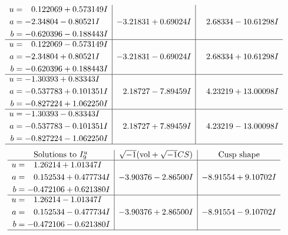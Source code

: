 \documentclass[1p]{elsarticle_modified}
\theoremstyle{definition}
\newcommand{\I}{\sqrt{-1}}
\begin{document}
$$\begin{array}{c|c|c}
\begin{aligned}
u &= \phantom{-}0.122069 + 0.573149 I \\
a &= -2.34804 - 0.80521 I \\
b &= -0.620396 - 0.188443 I\end{aligned}
 & -3.21831 + 0.69024 I & \phantom{-}2.68334 - 10.61298 I \\ \hline\begin{aligned}
u &= \phantom{-}0.122069 - 0.573149 I \\
a &= -2.34804 + 0.80521 I \\
b &= -0.620396 + 0.188443 I\end{aligned}
 & -3.21831 - 0.69024 I & \phantom{-}2.68334 + 10.61298 I \\ \hline\begin{aligned}
u &= -1.30393 + 0.83343 I \\
a &= -0.537783 + 0.101351 I \\
b &= -0.827224 + 1.062250 I\end{aligned}
 & \phantom{-}2.18727 - 7.89459 I & \phantom{-}4.23219 + 13.00098 I \\ \hline\begin{aligned}
u &= -1.30393 - 0.83343 I \\
a &= -0.537783 - 0.101351 I \\
b &= -0.827224 - 1.062250 I\end{aligned}
 & \phantom{-}2.18727 + 7.89459 I & \phantom{-}4.23219 - 13.00098 I\\
 \hline 
 \end{array}$$\newpage$$\begin{array}{c|c|c}  
\text{Solutions to }I^u_{9}& \I (\text{vol} + \sqrt{-1}CS) & \text{Cusp shape}\\
 \hline 
\begin{aligned}
u &= \phantom{-}1.26214 + 1.01347 I \\
a &= \phantom{-}0.152534 + 0.477734 I \\
b &= -0.472106 + 0.621380 I\end{aligned}
 & -3.90376 - 2.86500 I & -8.91554 + 9.10702 I \\ \hline\begin{aligned}
u &= \phantom{-}1.26214 - 1.01347 I \\
a &= \phantom{-}0.152534 - 0.477734 I \\
b &= -0.472106 - 0.621380 I\end{aligned}
 & -3.90376 + 2.86500 I & -8.91554 - 9.10702 I\\
 \hline 
 \end{array}$$\newpage\newpage\renewcommand{\arraystretch}{1}
\end{document}
